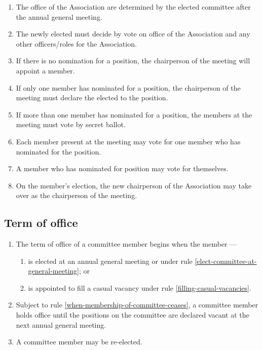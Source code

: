 \documentclass[../constitution.tex]{subfiles}
\begin{document}
\begin{enumerate}

\item The office  of the Association are determined by the elected committee after the annual general meeting. 
\item The newly elected  must decide by vote on office  of the Association and any other officers/roles for the Association. 
\item If there is no nomination for a position, the chairperson of the meeting will appoint a member.
\item If only one member has nominated for a position, the chairperson of the meeting must declare the  elected to the position.
\item If more than one  member has nominated for a position, the  members at the meeting must vote by secret ballot.
\item Each  member present at the meeting may vote for one member who has nominated for the position.
\item A  member who has nominated for  position may vote for themselves.
\item On the  member's election, the new chairperson of the Association may take over as the chairperson of the meeting.
\end{enumerate}

\hypertarget{term-of-office}{%
\subsection{Term of office}\label{term-of-office}}

\begin{enumerate}

\item The term of office of a committee member begins when the member ---

  \begin{enumerate}
  
  \item is elected at an annual general meeting or under rule \ref{elect-committee-at-general-meeting}; or
  \item is appointed to fill a casual vacancy under rule \ref{filling-casual-vacancies}.
  \end{enumerate}
\item Subject to rule \ref{when-membership-of-committee-ceases}, a committee member holds office until the positions on the committee are declared vacant at the next annual general meeting.
\item A committee member may be re-elected.
\end{enumerate}
\end{document}
